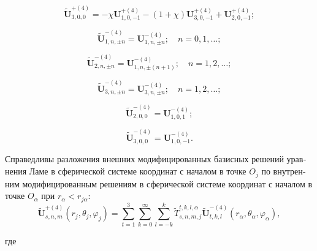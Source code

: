 \begin{russian}
\begin{equation}\label{eq:1:94b}
\mathbf{\tilde U}_{3,0,0}^{+(4)}=-\chi\mathbf{U}_{1,0,-1}^{+(4)}-(1+\chi)\mathbf{U}_{3,0,-1}^{+(4)}+\mathbf{U}_{2,0,-1}^{+(4)};
\end{equation}

\begin{equation}\label{eq:1:95b}
\mathbf{\tilde U}_{1,n,\pm n}^{-(4)}=\mathbf{U}_{1,n,\pm n}^{-(4)};\quad n=0,1,\dots;
\end{equation}

\begin{equation}\label{eq:1:96b}
\mathbf{\tilde U}_{2,n,\pm n}^{-(4)}=\mathbf{U}_{1,n,\pm (n+1)}^{-(4)};\quad n=1,2,\dots;
\end{equation}

\begin{equation}\label{eq:1:97b}
\mathbf{\tilde U}_{3,n,\pm n}^{-(4)}=\mathbf{U}_{3,n,\pm n}^{-(4)};\quad n=1,2,\dots;
\end{equation}

\begin{equation}\label{eq:1:98b}
\mathbf{\tilde U}_{2,0,0}^{-(4)}=\mathbf{U}_{1,0,1}^{-(4)};
\end{equation}

\begin{equation}\label{eq:1:99b}
\mathbf{\tilde U}_{3,0,0}^{-(4)}=\mathbf{U}_{1,0,-1}^{-(4)}.
\end{equation}

\begin{theorem}
Справедливы разложения внешних модифицированных базисных решений уравнения Ламе в сферической системе координат с началом в точке $O_j$ по внутренним модифицированным решениям в сферической системе координат с началом в точке $O_\alpha$ при $r_\alpha<r_{j\alpha}$:
\begin{equation}
\mathbf{\tilde U}_{s,n,m}^{+(4)}(r_j,\theta_j,\varphi_j)=\sum\limits_{t=1}^3\sum\limits_{k=0}^\infty\sum\limits_{l=-k}^k\tilde T_{s,n,m,j}^{t,k,l,\alpha}\mathbf{\tilde U}_{t,k,l}^{-(4)}(r_\alpha,\theta_\alpha,\varphi_\alpha),
\label{eq:1:99t}
\end{equation}

\noindent где


\end{theorem}
\end{russian}
